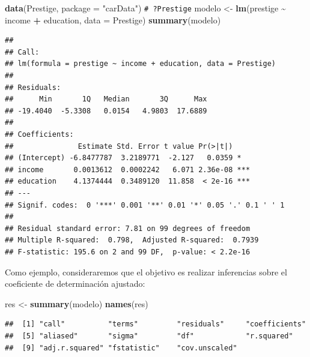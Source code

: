 \documentclass[
]{book}
\newenvironment{Shaded}{\begin{snugshade}}{\end{snugshade}}
\newcommand{\AttributeTok}[1]{\textcolor[rgb]{0.13,0.29,0.53}{#1}}
\newcommand{\CommentTok}[1]{\textcolor[rgb]{0.56,0.35,0.01}{\textit{#1}}}
\newcommand{\FunctionTok}[1]{\textcolor[rgb]{0.13,0.29,0.53}{\textbf{#1}}}
\newcommand{\NormalTok}[1]{#1}
\newcommand{\OtherTok}[1]{\textcolor[rgb]{0.56,0.35,0.01}{#1}}
\newcommand{\SpecialCharTok}[1]{\textcolor[rgb]{0.81,0.36,0.00}{\textbf{#1}}}
\newcommand{\StringTok}[1]{\textcolor[rgb]{0.31,0.60,0.02}{#1}}
\theoremstyle{break}
\theoremstyle{nonumberplain}
\renewcommand{\CommentTok}[1]{\textcolor[rgb]{0.41,0.41,0.41}{\texttt{#1}}}
\begin{document}
\begin{Shaded}
\begin{Highlighting}[]
\FunctionTok{data}\NormalTok{(Prestige, }\AttributeTok{package =} \StringTok{"carData"}\NormalTok{)}
\CommentTok{\# ?Prestige}
\NormalTok{modelo }\OtherTok{\textless{}{-}} \FunctionTok{lm}\NormalTok{(prestige }\SpecialCharTok{\textasciitilde{}}\NormalTok{ income }\SpecialCharTok{+}\NormalTok{ education, }\AttributeTok{data =}\NormalTok{ Prestige)}
\FunctionTok{summary}\NormalTok{(modelo)}
\end{Highlighting}
\end{Shaded}

\begin{verbatim}
## 
## Call:
## lm(formula = prestige ~ income + education, data = Prestige)
## 
## Residuals:
##      Min       1Q   Median       3Q      Max 
## -19.4040  -5.3308   0.0154   4.9803  17.6889 
## 
## Coefficients:
##               Estimate Std. Error t value Pr(>|t|)    
## (Intercept) -6.8477787  3.2189771  -2.127   0.0359 *  
## income       0.0013612  0.0002242   6.071 2.36e-08 ***
## education    4.1374444  0.3489120  11.858  < 2e-16 ***
## ---
## Signif. codes:  0 '***' 0.001 '**' 0.01 '*' 0.05 '.' 0.1 ' ' 1
## 
## Residual standard error: 7.81 on 99 degrees of freedom
## Multiple R-squared:  0.798,  Adjusted R-squared:  0.7939 
## F-statistic: 195.6 on 2 and 99 DF,  p-value: < 2.2e-16
\end{verbatim}

Como ejemplo, consideraremos que el objetivo es realizar inferencias sobre el coeficiente de determinación ajustado:

\begin{Shaded}
\begin{Highlighting}[]
\NormalTok{res }\OtherTok{\textless{}{-}} \FunctionTok{summary}\NormalTok{(modelo)}
\FunctionTok{names}\NormalTok{(res)}
\end{Highlighting}
\end{Shaded}

\begin{verbatim}
##  [1] "call"          "terms"         "residuals"     "coefficients" 
##  [5] "aliased"       "sigma"         "df"            "r.squared"    
##  [9] "adj.r.squared" "fstatistic"    "cov.unscaled"
\end{verbatim}

\begin{Shaded}
\end{Shaded}
\end{document}
